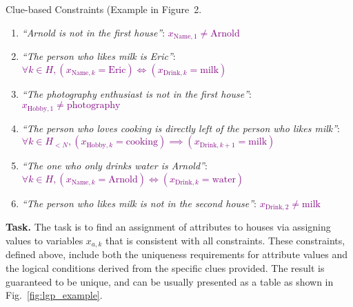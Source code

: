 \vspace{-0.3cm}
\begin{AIbox}{Clue-based Constraints (Example in Figure~2.}
    \small 
    \begin{enumerate}[label=\textbf{Clue \arabic*.}, leftmargin=2.2em, itemsep=0em]
        \item \textit{``Arnold is not in the first house''}: \textcolor{purple}{\( x_{\text{Name},1} \ne \text{Arnold} \)}
        \item \textit{``The person who likes milk is Eric''}:  
            \textcolor{purple}{$\forall k \in H,(x_{\text{Name},k} = \text{Eric}) \iff (x_{\text{Drink},k} = \text{milk})$}
        \item \textit{``The photography enthusiast is not in the first house''}: \textcolor{purple}{\( x_{\text{Hobby},1} \ne \text{photography} \)}
        \item \textit{``The person who loves cooking is directly left of the person who likes milk''}: \textcolor{purple}{\(\forall k\in{H}_{<N},(x_{\text{Hobby},k} = \text{cooking})\implies(x_{\text{Drink},k+1} = \text{milk})\)} 
        \item \textit{``The one who only drinks water is Arnold''}: \textcolor{purple}{$\forall k \in H,(x_{\text{Name},k} = \text{Arnold}) \iff (x_{\text{Drink},k} = \text{water})$}
        \item \textit{``The person who likes milk is not in the second house''}: \textcolor{purple}{\( x_{\text{Drink},2} \ne \text{milk} \)}
    \end{enumerate}
\end{AIbox}
\vspace{-0.1cm}

 





\textbf{Task.}
The task is to find an assignment of attributes to houses via assigning values to variables $x_{a,k}$
 that is consistent with all constraints. These constraints, defined above, include both the uniqueness requirements for attribute values and the logical conditions derived from the specific clues provided. 
The result is guaranteed to be unique, and can be usually presented as a table as shown in Fig.~\ref{fig:lgp_example}. 


